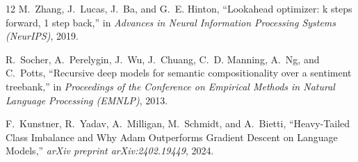\documentclass[conference]{IEEEtran}
\begin{document}
\begin{thebibliography}{12}
M.~Zhang, J.~Lucas, J.~Ba, and G.~E. Hinton, ``Lookahead optimizer: k steps forward, 1 step back,'' in \emph{Advances in Neural Information Processing Systems (NeurIPS)}, 2019.

R.~Socher, A.~Perelygin, J.~Wu, J.~Chuang, C.~D. Manning, A.~Ng, and C.~Potts, ``Recursive deep models for semantic compositionality over a sentiment treebank,'' in \emph{Proceedings of the Conference on Empirical Methods in Natural Language Processing (EMNLP)}, 2013.

F.~Kunstner, R.~Yadav, A.~Milligan, M.~Schmidt, and A.~Bietti, ``Heavy-Tailed Class Imbalance and Why Adam Outperforms Gradient Descent on Language Models,'' \emph{arXiv preprint arXiv:2402.19449}, 2024.


\end{thebibliography}













\end{document}

